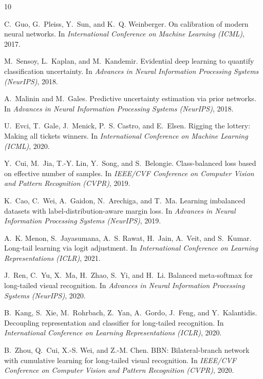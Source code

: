 \documentclass[letterpaper]{article} %
\begin{document}
\begin{thebibliography}{10}\itemsep=-1pt

C.~Guo, G.~Pleiss, Y.~Sun, and K.~Q. Weinberger.
\newblock On calibration of modern neural networks.
\newblock In {\em International Conference on Machine Learning (ICML)}, 2017.

M.~Sensoy, L.~Kaplan, and M.~Kandemir.
\newblock Evidential deep learning to quantify classification uncertainty.
\newblock In {\em Advances in Neural Information Processing Systems (NeurIPS)}, 2018.

A.~Malinin and M.~Gales.
\newblock Predictive uncertainty estimation via prior networks.
\newblock In {\em Advances in Neural Information Processing Systems (NeurIPS)}, 2018.

U.~Evci, T.~Gale, J.~Menick, P.~S. Castro, and E.~Elsen.
\newblock Rigging the lottery: Making all tickets winners.
\newblock In {\em International Conference on Machine Learning (ICML)}, 2020.

Y.~Cui, M.~Jia, T.-Y. Lin, Y.~Song, and S.~Belongie.
\newblock Class-balanced loss based on effective number of samples.
\newblock In {\em IEEE/CVF Conference on Computer Vision and Pattern Recognition (CVPR)}, 2019.

K.~Cao, C.~Wei, A.~Gaidon, N.~Arechiga, and T.~Ma.
\newblock Learning imbalanced datasets with label-distribution-aware margin loss.
\newblock In {\em Advances in Neural Information Processing Systems (NeurIPS)}, 2019.

A.~K. Menon, S.~Jayasumana, A.~S. Rawat, H.~Jain, A.~Veit, and S.~Kumar.
\newblock Long-tail learning via logit adjustment.
\newblock In {\em International Conference on Learning Representations (ICLR)}, 2021.

J.~Ren, C.~Yu, X.~Ma, H.~Zhao, S.~Yi, and H.~Li.
\newblock Balanced meta-softmax for long-tailed visual recognition.
\newblock In {\em Advances in Neural Information Processing Systems (NeurIPS)}, 2020.

B.~Kang, S.~Xie, M.~Rohrbach, Z.~Yan, A.~Gordo, J.~Feng, and Y.~Kalantidis.
\newblock Decoupling representation and classifier for long-tailed recognition.
\newblock In {\em International Conference on Learning Representations (ICLR)}, 2020.

B.~Zhou, Q.~Cui, X.-S. Wei, and Z.-M. Chen.
\newblock BBN: Bilateral-branch network with cumulative learning for long-tailed visual recognition.
\newblock In {\em IEEE/CVF Conference on Computer Vision and Pattern Recognition (CVPR)}, 2020.


\end{thebibliography}
\end{document}
